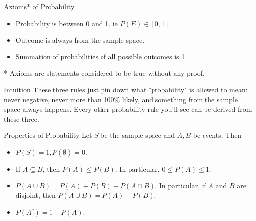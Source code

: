 %

\begin{frame}{Axioms* of Probability}
\begin{itemize}
\item Probability is between 0 and 1. ie $P(E) \in [0,1]$
\item Outcome is always from the sample space.
\item Summation of probabilities of all possible outcomes is 1
\end{itemize}

* Axioms are statements considered to be true without any proof.

\begin{block}{Intuition}
These three rules just pin down what "probability" is allowed to mean: never negative, never more than 100\% likely, and something from the sample space always happens. Every other probability rule you'll see can be derived from these three.
\end{block}
\end{frame}



\begin{frame}{Properties of Probability}
Let $S$ be the sample space and $A,B$ be events.  Then
\begin{itemize}
\item $P(S)=1, P(\emptyset)=0$. 
\item If $A\subseteq B$, then $P(A)\leq P(B)$.  In particular, $0\leq P(A)\leq 1$. 
\item $P(A\cup B)=P(A)+P(B)-P(A\cap B)$.  In particular, if $A$ and $B$ are disjoint, then $P(A
\cup B)=P(A)+P(B)$. 
\item $P(A^c)=1-P(A)$.
\end{itemize}
\end{frame}


